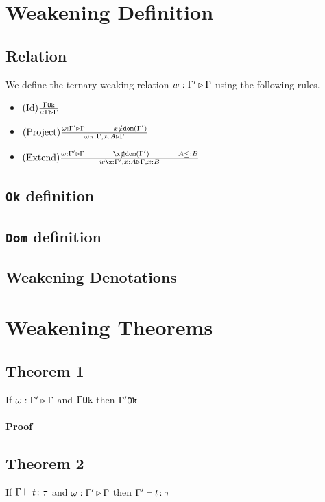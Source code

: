 \documentclass{report}
\begin{document}
    \section{Weakening Definition}
    \subsection{Relation}
    We define the ternary weaking relation $w : \Gamma' \triangleright \Gamma$ using the following rules.

    \begin{itemize}
        \item $(\text{Id}) \frac{\Gamma \texttt{Ok}}{\iota : \Gamma \triangleright \Gamma}$
        \item $\treerule{Project}{\wrel{\w}{\G'}{\G}\s\s x \notin \dom{\G'}}{\wrel{\w \pi}{\G, x: A}{\G}}$
        \item $\treerule{Extend}{\wrel{\w}{\G'}{\G}\s\s\x \notin \dom{\G'}\s\s A \subtype B}{\wrel{w \x}{\G', x: A}{\G, x: B}}$
    \end{itemize}

    \subsection{\texttt{Ok} definition}

    \subsection{\texttt{Dom} definition}

    \subsection{Weakening Denotations}
    \section{Weakening Theorems}
    \subsection{Theorem 1}
    If $\omega : \Gamma' \triangleright \Gamma$ and $\Gamma \texttt{Ok}$ then $\Gamma' \texttt{Ok}$
    \paragraph{Proof}
    \subsection{Theorem 2}
    If $\Gamma \vdash t \colon \tau$ and $\omega : \Gamma' \triangleright \Gamma$ then $\Gamma' \vdash t \colon \tau$
\end{document}
